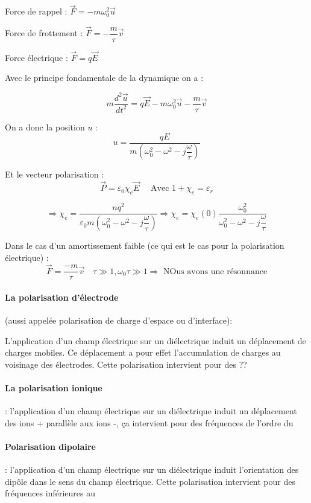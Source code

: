 \documentclass[12pt,a4paper]{report}
\begin{document}
Force de rappel : \(\vec{F} = - m \omega_0^2 \vec{u}\)

Force de frottement : \(\vec{F} = - \dfrac{m}{\tau} \vec{v}\)

Force électrique : \(\vec{F} = q\vec{E}\)

Avec le principe fondamentale de la dynamique on a :

\[
	m \dfrac{d^2 \vec{u}}{dt^2} = q\vec{E} - m\omega_0^2 \vec{u} - \dfrac{m}{\tau} \vec{v}
\]

On a donc la position \(u\) :
\[
	u = \dfrac{qE}{m\left( \omega_0^2 - \omega^2 - j \dfrac{\omega}{\tau}\right)}
\]

Et le vecteur polarisation :
\[
	\vec{P} = \varepsilon_0 \chi_e \vec{E} \quad \text{ Avec } 1 + \chi_e = \varepsilon_r
\]

\[
	\Rightarrow \chi_e = \dfrac{nq^2}{\varepsilon_0 m\left( \omega_0^2 - \omega^2 - j \dfrac{\omega}{\tau}\right)} \Rightarrow \chi_e = \chi_e(0)\dfrac{\omega_0^2}{\omega_0^2 - \omega^2 - j \dfrac{\omega}{\tau}}
\]

Dans le cas d'un amortissement faible (ce qui est le cas pour la polarisation électrique) :
\[
	\vec{F} = \dfrac{-m}{\tau}\vec{v} \quad \tau \gg 1, \omega_0 \tau \gg 1 \Rightarrow \text{ NOus avons une résonnance}
\]

\paragraph{La polarisation d'électrode} (aussi appelée polarisation de charge d'espace ou d'interface):

L'application d'un champ électrique sur un diélectrique induit un déplacement de charges mobiles. Ce déplacement a pour effet l'accumulation de charges au voisinage des électrodes. Cette polarisation intervient pour des ??

\paragraph{La polarisation ionique} : l'application d'un champ électrique sur un diélectrique induit un déplacement des ions + parallèle aux ions -, ça intervient pour des fréquences de l'ordre du \unit{}{\tera\hertz}

\paragraph{Polarisation dipolaire} : l'application d'un champ électrique sur un diélectrique induit l'orientation des dipôle dans le sens du champ électrique. Cette polarisation intervient pour des fréquences inférieures au \unit{}{\giga\hertz}
\end{document}
